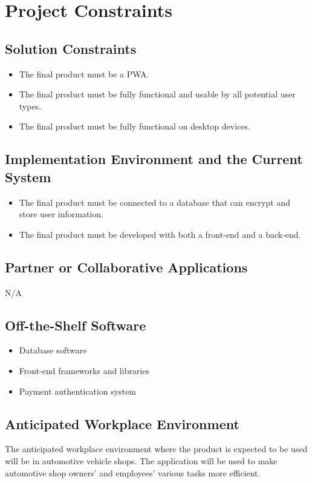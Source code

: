 \documentclass[12pt]{article}
\begin{document}
\section{Project Constraints}
\subsection{Solution Constraints}
\begin{itemize}
    \item The final product must be a PWA.
    \item The final product must be fully functional and usable by all potential user types.
    \item The final product must be fully functional on desktop devices.
\end{itemize}

\subsection{Implementation Environment and the Current System}
\begin{itemize}
    \item The final product must be connected to a database that can encrypt and store user information.
    \item The final product must be developed with both a front-end and a back-end.
\end{itemize}

\subsection{Partner or Collaborative Applications}
N/A
\subsection{Off-the-Shelf Software}
\begin{itemize}
    \item Database software
    \item Front-end frameworks and libraries
    \item Payment authentication system
\end{itemize}

\subsection{Anticipated Workplace Environment}
The anticipated workplace environment where the product is expected to be used will be in automotive vehicle shops. The application will be used to make automotive shop owners' and employees' various tasks more efficient.
\end{document}
